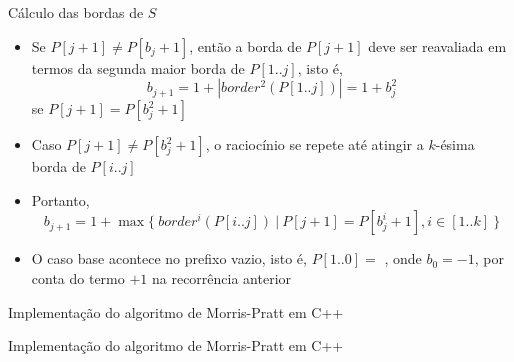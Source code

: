 \begin{frame}[fragile]{Cálculo das bordas de $S$}

    \begin{itemize}
        \item Se $P[j + 1] \neq P[b_j + 1]$, então a borda de $P[j + 1]$ deve ser reavaliada
            em termos da segunda maior borda de $P[1..j]$, isto é,
        \[
            b_{j + 1} = 1 + |border^2(P[1..j])| = 1 + b_j^2
        \]
        se $P[j + 1] = P[b_j^2 + 1]$

        \item Caso $P[j + 1] \neq P[b_j^2 + 1]$, o raciocínio se repete até atingir a $k$-ésima
            borda de $P[i..j]$

        \item Portanto,
        \[
            b_{j + 1} = 1 + \max \lbrace\ border^i(P[i..j])\ |\ P[j + 1] = P[b_j^i + 1], i\in [1..k]\ \rbrace
        \]

        \item O caso base acontece no prefixo vazio, isto é, $P[1..0] = $ , onde
            $b_0 = -1$, por conta do termo $+1$ na recorrência anterior

    \end{itemize}

\end{frame}

\begin{frame}[fragile]{Implementação do algoritmo de Morris-Pratt em C++}
\end{frame}

\begin{frame}[fragile]{Implementação do algoritmo de Morris-Pratt em C++}
\end{frame}
